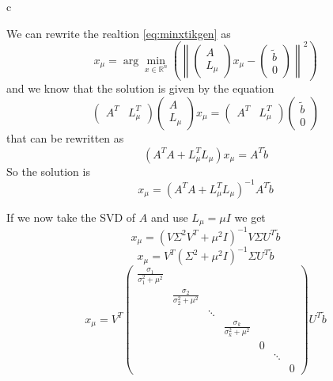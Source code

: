 c\documentclass[a4paper,10pt]{article}
\theoremstyle{plain}
\theoremstyle{definition}
\theoremstyle{remark}
\newcommand{\pa}[1]{\left(#1\right)}
\newcommand{\norm}[1]{\left\|#1\right\|}
\begin{document}
We can rewrite the realtion \ref{eq:minxtikgen} as
\begin{equation*}
  x_\mu = \arg\min _{x \in \mathbb{R}^n} \pa{ \norm{ 
      \begin{pmatrix}
        A \\
        L_\mu
      \end{pmatrix}
      x_\mu -
      \begin{pmatrix}
        \tilde b\\
        0
      \end{pmatrix}
      }^2 }
\end{equation*}
and we know that the solution is given by the equation
\begin{equation*}
  \begin{pmatrix}
    A^T & L_\mu ^T
  \end{pmatrix}
  \begin{pmatrix}
    A \\
    L_\mu
  \end{pmatrix}
  x_\mu = 
  \begin{pmatrix}
    A^T & L_\mu ^T
  \end{pmatrix}
  \begin{pmatrix}
    \tilde b\\
    0
  \end{pmatrix}
\end{equation*}
that can be rewritten as
\begin{equation*}
  \pa{ A^T A + L_\mu^T L_\mu } x_\mu = A^T \tilde b 
\end{equation*}
So the solution is
\begin{equation}
  \label{eq:xtikigen}
  x_\mu = \pa{ A^T A + L_\mu^T L_\mu }^{-1} A^T \tilde b
\end{equation}

If we now take the SVD of $A$ and use $L_\mu = \mu I$ we get
\[  x_\mu = \pa{ V \Sigma ^2 V^T + \mu ^2 I }^{-1} V \Sigma U^T \tilde b  \]
\[  x_\mu = V^T \pa{\Sigma ^2 + \mu ^2 I }^{-1} \Sigma U^T \tilde b \]
\[  x_\mu = V^T
  \begin{pmatrix}
    \frac{\sigma _1 }{\sigma _1 ^2 + \mu ^2} \\
    & \frac{\sigma _2 }{\sigma _2 ^2 + \mu ^2} \\
    & & \ddots \\
    & & & \frac{\sigma _k }{\sigma _k ^2 + \mu ^2}\\
    & & & & 0\\
    & & & & & \ddots \\
    & & & & & & 0
  \end{pmatrix}
  U^T \tilde  b \]
\end{document}
